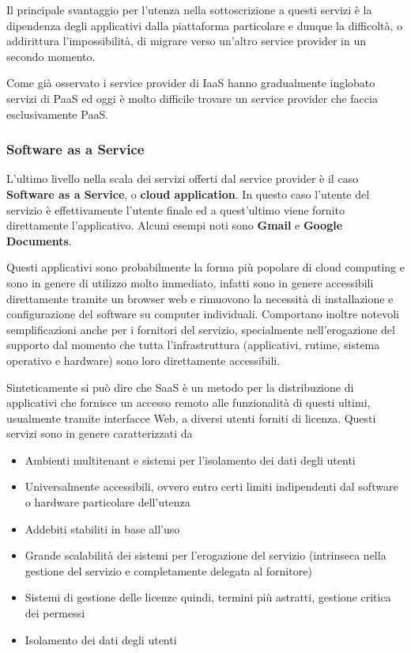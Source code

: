 \documentclass[italian,]{article}
\providecommand{\tightlist}{%
  \setlength{\itemsep}{0pt}\setlength{\parskip}{0pt}}
\begin{document}
Il principale svantaggio per l'utenza nella sottoscrizione a questi
servizi è la dipendenza degli applicativi dalla piattaforma particolare
e dunque la difficoltà, o addirittura l'impossibilità, di migrare verso
un'altro service provider in un secondo momento.

Come già osservato i service provider di IaaS hanno gradualmente
inglobato servizi di PaaS ed oggi è molto difficile trovare un service
provider che faccia esclusivamente PaaS.

\subsubsection{Software as a Service}\label{software-as-a-service}

L'ultimo livello nella scala dei servizi offerti dal service provider è
il caso \textbf{Software as a Service}, o \textbf{cloud application}. In
questo caso l'utente del servizio è effettivamente l'utente finale ed a
quest'ultimo viene fornito direttamente l'applicativo. Alcuni esempi
noti sono \textbf{Gmail} e \textbf{Google Documents}.

Questi applicativi sono probabilmente la forma più popolare di cloud
computing e sono in genere di utilizzo molto immediato, infatti sono in
genere accessibili direttamente tramite un browser web e rimuovono la
necessità di installazione e configurazione del software su computer
individuali. Comportano inoltre notevoli semplificazioni anche per i
fornitori del servizio, specialmente nell'erogazione del supporto dal
momento che tutta l'infrastruttura (applicativi, rutime, sistema
operativo e hardware) sono loro direttamente accessibili.

Sinteticamente si può dire che SaaS è un metodo per la distribuzione di
applicativi che fornisce un accesso remoto alle funzionalità di questi
ultimi, usualmente tramite interfacce Web, a diversi utenti forniti di
licenza. Questi servizi sono in genere caratterizzati da

\begin{itemize}
\tightlist
\item
  Ambienti multitenant e sistemi per l'isolamento dei dati degli utenti
\item
  Universalmente accessibili, ovvero entro certi limiti indipendenti dal
  software o hardware particolare dell'utenza
\item
  Addebiti stabiliti in base all'uso
\item
  Grande scalabilità dei sistemi per l'erogazione del servizio
  (intrinseca nella gestione del servizio e completamente delegata al
  fornitore)
\item
  Sistemi di gestione delle licenze quindi, termini più astratti,
  gestione critica dei permessi
\item
  Isolamento dei dati degli utenti
\end{itemize}
\end{document}
